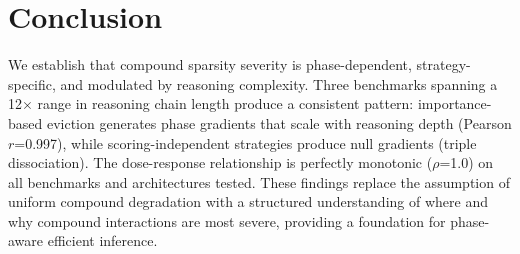 \documentclass[11pt,a4paper]{article}
\begin{document}
\section{Conclusion}

We establish that compound sparsity severity is phase-dependent, strategy-specific, and modulated by reasoning complexity. Three benchmarks spanning a 12$\times$ range in reasoning chain length produce a consistent pattern: importance-based eviction generates phase gradients that scale with reasoning depth (Pearson $r$=0.997), while scoring-independent strategies produce null gradients (triple dissociation). The dose-response relationship is perfectly monotonic ($\rho$=1.0) on all benchmarks and architectures tested. These findings replace the assumption of uniform compound degradation with a structured understanding of where and why compound interactions are most severe, providing a foundation for phase-aware efficient inference.



\end{document}
